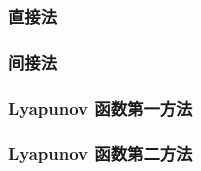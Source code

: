 \documentclass[orivec]{llncs}
\begin{document}
\subsubsection{直接法}

\subsubsection{间接法}

\subsubsection{Lyapunov 函数第一方法}

\subsubsection{Lyapunov 函数第二方法}


\end{document}
